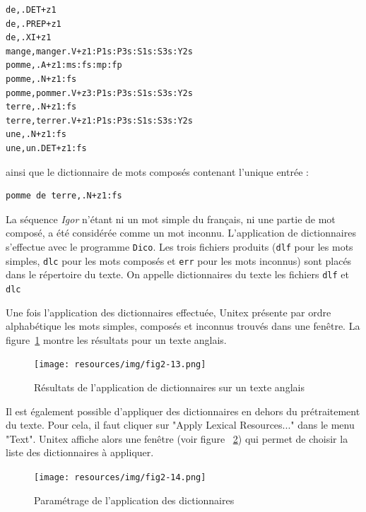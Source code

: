 \bigskip
\begin{verbatim}
de,.DET+z1
de,.PREP+z1
de,.XI+z1
mange,manger.V+z1:P1s:P3s:S1s:S3s:Y2s
pomme,.A+z1:ms:fs:mp:fp
pomme,.N+z1:fs
pomme,pommer.V+z3:P1s:P3s:S1s:S3s:Y2s
terre,.N+z1:fs
terre,terrer.V+z1:P1s:P3s:S1s:S3s:Y2s
une,.N+z1:fs
une,un.DET+z1:fs
\end{verbatim}

\bigskip
\noindent ainsi que le dictionnaire de mots composés contenant l’unique entrée
:

\bigskip
\begin{verbatim}
pomme de terre,.N+z1:fs
\end{verbatim}

\bigskip
\noindent La séquence \textit{Igor} n'étant ni un mot simple du français, ni une partie de mot
composé, a été considérée comme un mot inconnu. L’application de dictionnaires
s’effectue avec le programme \verb+Dico+.
Les trois fichiers produits (\verb+dlf+ pour les mots simples, \verb+dlc+ pour les mots composés et
\verb+err+ pour les mots inconnus) sont placés dans le répertoire du texte. On appelle dictionnaires
du texte les fichiers \verb+dlf+ et \verb+dlc+

\bigskip
\noindent Une fois l’application des dictionnaires effectuée, Unitex présente par ordre alphabétique
les mots simples, composés et inconnus trouvés dans une fenêtre. La figure~\ref{fig-Dico-application-results} montre les résultats pour un texte anglais.

\begin{figure}[!ht]
\begin{center}
\texttt{[image: resources/img/fig2-13.png]}
\caption{Résultats de l’application de dictionnaires sur un texte
anglais\label{fig-Dico-application-results}}
\end{center}
\end{figure}

\bigskip
\noindent Il est également possible d’appliquer des dictionnaires en dehors du prétraitement du
texte. Pour cela, il faut cliquer sur "Apply Lexical Resources..." dans le menu "Text". Unitex
affiche alors une fenêtre (voir figure ~\ref{fig-Dico-configuration}) qui permet de choisir la
liste des dictionnaires à appliquer.


\begin{figure}[!ht]
\begin{center}
\texttt{[image: resources/img/fig2-14.png]}
\caption{Paramétrage de l’application des dictionnaires\label{fig-Dico-configuration}}
\end{center}
\end{figure}

